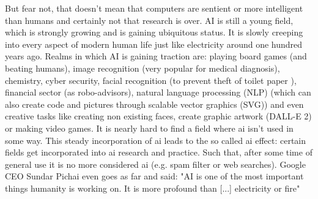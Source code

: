 But fear not, that doesn't mean that computers are sentient or more intelligent than humans\cite{searle1980,searle1999married} and certainly not that research is over. 
AI is still a young field, which is strongly growing and is gaining ubiquitous status. 
It is slowly creeping into every aspect of modern human life just like electricity around one hundred years ago. 
Realms in which AI is gaining traction are: 
%
playing board games (and beating humans)\cite{Silver2017,Feng1999,Campbell2002}, 
image recognition (very popular for medical diagnosis)\cite{Li2020,Deo2015,Topol2019,Fujiyoshi2019}, 
chemistry\cite{Westermayr2019,goh2017chemception,jha2018elemnet}, 
cyber security\cite{Sarker2021},
facial recognition (to prevent theft of toilet paper \cite{Andrews2017}),
financial sector (as robo-advisors)\cite{Littman2021},
natural language processing (NLP)\cite{Koroteev2021,Liu2021gpt,Parviainen2021} 
(which can also create code and pictures through scalable vector graphics (SVG))
and even creative tasks like 
creating non existing faces\cite{Mansourifar2020}, 
create graphic artwork (DALL-E 2)\cite{Marcus2022} or 
making video games\cite{Guzdial2016}.
%
It is nearly hard to find a field where \gls{ai} isn't used in some way. 
This steady incorporation of \gls{ai} leads to the so called \gls{ai} effect\cite{McCorduck1982,ai100}: 
certain fields get incorporated into \gls{ai} research and practice.
Such that, after some time of general use it is no more considered \gls{ai} (e.g. spam filter or web searches).
Google CEO Sundar Pichai even goes as far and said: 
"AI is one of the most important things humanity is working on. It is more profound than [...] electricity or fire"\cite{Hassan2020}

%
